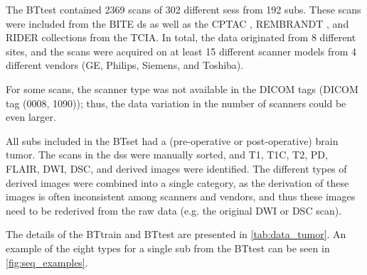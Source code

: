 The \gls{BTtest} contained \num{2369} \glspl{scan} of \num{302} different \glspl{ses} from \num{192} \glspl{sub}.
These \glspl{scan} were included from the \gls{BITE} \gls{ds} \autocite{mercier2012online} as well as the \gls{CPTAC} \autocite*{cptac2018radiology}, \gls{REMBRANDT} \autocite{scarpace2015radiology}, and \gls{RIDER} \autocite{barboriak2015radiology} collections from the \gls{TCIA}.
In total, the data originated from \num{8} different \glspl{site}, and the \glspl{scan} were acquired on at least \num{15} different scanner models from \num{4} different vendors (GE, Philips, Siemens, and Toshiba).

For some \glspl{scan}, the scanner type was not available in the \gls{DICOM} tags (\gls{DICOM} tag (0008, 1090)); thus, the data variation in the number of scanners could be even larger.

All \glspl{sub} included in the \gls{BTset} had a (pre-operative or post-operative) brain \gls{tumor}.
The \glspl{scan} in the \glspl{ds} were manually sorted, and \gls{T1}, \gls{T1C}, \gls{T2}, \gls{PD}, \gls{FLAIR}, \gls{DWI}, \gls{DSC}, and derived images were identified.
The different types of derived images were combined into a single category, as the derivation of these images is often inconsistent among scanners and vendors, and thus these images need to be rederived from the raw data (e.g. the original \gls{DWI} or \gls{DSC} \gls{scan}).

The details of the \gls{BTtrain} and \gls{BTtest} are presented in \cref{tab:data_tumor}.
An example of the eight \glspl{type} for a single \gls{sub} from the \gls{BTtest} can be seen in \cref{fig:seq_examples}.

